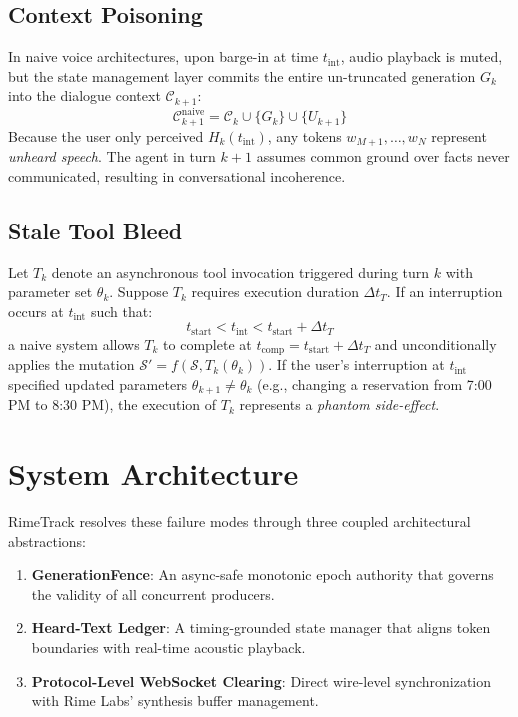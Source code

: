 \documentclass[10pt,journal,compsoc]{IEEEtran}
\theoremstyle{definition}
\begin{document}
\subsection{Context Poisoning}
In naive voice architectures, upon barge-in at time $t_{\text{int}}$, audio playback is muted, but the state management layer commits the entire un-truncated generation $G_k$ into the dialogue context $\mathcal{C}_{k+1}$:
\begin{equation}
\mathcal{C}_{k+1}^{\text{naive}} = \mathcal{C}_k \cup \{ G_k \} \cup \{ U_{k+1} \}
\end{equation}
Because the user only perceived $H_k(t_{\text{int}})$, any tokens $w_{M+1}, \dots, w_N$ represent \textit{unheard speech}. The agent in turn $k+1$ assumes common ground over facts never communicated, resulting in conversational incoherence.

\subsection{Stale Tool Bleed}
Let $T_k$ denote an asynchronous tool invocation triggered during turn $k$ with parameter set $\theta_k$. Suppose $T_k$ requires execution duration $\Delta t_T$. If an interruption occurs at $t_{\text{int}}$ such that:
\begin{equation}
t_{\text{start}} < t_{\text{int}} < t_{\text{start}} + \Delta t_T
\end{equation}
a naive system allows $T_k$ to complete at $t_{\text{comp}} = t_{\text{start}} + \Delta t_T$ and unconditionally applies the mutation $\mathcal{S}' = f(\mathcal{S}, T_k(\theta_k))$. If the user's interruption at $t_{\text{int}}$ specified updated parameters $\theta_{k+1} \neq \theta_k$ (e.g., changing a reservation from 7:00 PM to 8:30 PM), the execution of $T_k$ represents a \textit{phantom side-effect}.

\section{System Architecture}

RimeTrack resolves these failure modes through three coupled architectural abstractions:
\begin{enumerate}
    \item \textbf{GenerationFence}: An async-safe monotonic epoch authority that governs the validity of all concurrent producers.
    \item \textbf{Heard-Text Ledger}: A timing-grounded state manager that aligns token boundaries with real-time acoustic playback.
    \item \textbf{Protocol-Level WebSocket Clearing}: Direct wire-level synchronization with Rime Labs' synthesis buffer management.
\end{enumerate}
\end{document}
